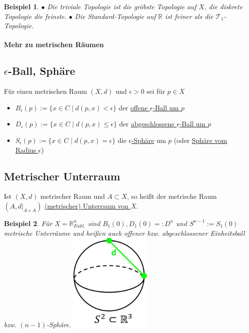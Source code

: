 \documentclass[a4paper,11pt,notitlepage]{report}
\newtheorem{example}{Beispiel}[chapter]
\newcommand{\R}{{\ensuremath{\mathbb{R}}}}
\newenvironment{Kasten}[1]
{
\hspace{0.05\linewidth}
\begin{center}
\begin{minipage}{0.9\linewidth}
\setlength{\fboxsep}{10pt}
\definecolor{shadecolor}{gray}{1}
\definecolor{framecolor}{gray}{0}
\def\FrameCommand{\fcolorbox{framecolor}{shadecolor}}
\MakeFramed {\FrameRestore}
\subsection{#1}
\begin{itshape}
}
{
\end{itshape}
\endMakeFramed
\end{minipage}
\end{center}
}
\begin{document}
\begin{example}
	$\bullet$ Die triviale Topologie ist die gröbste Topologie auf $X$, die diskrete Topologie die feinste.
	\newline
	$\bullet$ Die Standard-Topologie auf $\R$ ist feiner als die $\mathcal{T}_1$-Topologie.
\end{example}

\paragraph{Mehr zu metrischen Räumen}

\begin{Kasten}{$\epsilon$-Ball, Sphäre}
	Für einen metrischen Raum $(X,d)$ und $\epsilon > 0$ sei für $p \in X$
	\begin{itemize}
		\item $B_\epsilon(p):=\{x \in C \mid d(p,x) < \epsilon \}$ der \underline{offene $\epsilon$-Ball um $p$}
		\item $D_\epsilon(p):=\{x \in C \mid d(p,x) \leq \epsilon \}$ der \underline{abgeschlossene $\epsilon$-Ball um $p$}
		\item $S_\epsilon(p):=\{x \in C \mid d(p,x) = \epsilon \}$ die \underline{ $\epsilon$-Sphäre} um $p$ (oder \underline{Sphäre vom Radius $\epsilon$})
	\end{itemize}
\end{Kasten}

\begin{Kasten}{Metrischer Unterraum}
	Ist $(X,d)$ metrischer Raum und $A \subset X$, so heißt der metrische Raum $(A, d \big |_{A \times A})$ \underline{(metrischer) Unterraum von $X$}.
\end{Kasten}

\begin{example}
	Für $X=\R_{Eukl.}^{n}$ sind $B_1(0), D_1(0) =: D^n$ und $S^{n-1}:=S_1(0)$ metrische Unterräume und heißen auch offener bzw. abgeschlossener Einheitsball bzw. $(n-1)$-Sphäre.
	\newline
	\includegraphics[width=0.3\textwidth]{images/metrischer_unterraum.jpg}
\end{example}
\end{document}
